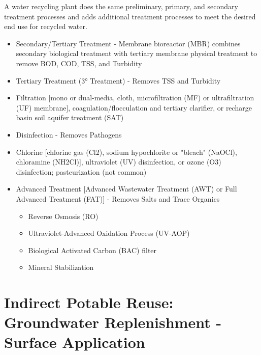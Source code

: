 A water recycling plant does the same preliminary, primary, and secondary treatment processes and adds additional treatment processes to meet the desired end use for recycled water.
\begin{itemize}
\item Secondary/Tertiary Treatment - Membrane bioreactor (MBR) combines secondary biological treatment with tertiary membrane physical treatment to remove BOD, COD, TSS, and Turbidity
\item Tertiary Treatment (3° Treatment) - Removes TSS and Turbidity
\item Filtration [mono or dual-media, cloth, microfiltration (MF) or ultrafiltration (UF) membrane], coagulation/flocculation and tertiary clarifier, or recharge basin soil aquifer treatment (SAT)
\item Disinfection - Removes Pathogens
\item Chlorine [chlorine gas (Cl2), sodium hypochlorite or "bleach" (NaOCl), chloramine (NH2Cl)], ultraviolet (UV) disinfection, or ozone  (O3) disinfection; pasteurization (not common)
\item Advanced Treatment [Advanced Wastewater Treatment (AWT) or Full Advanced Treatment (FAT)] - Removes Salts and Trace Organics
\begin{itemize}
\item Reverse Osmosis (RO)
\item Ultraviolet-Advanced Oxidation Process (UV-AOP)
\item Biological Activated Carbon (BAC) filter
\item Mineral Stabilization
\end{itemize}
\end{itemize}







\section{Indirect Potable Reuse: Groundwater Replenishment - Surface Application}
